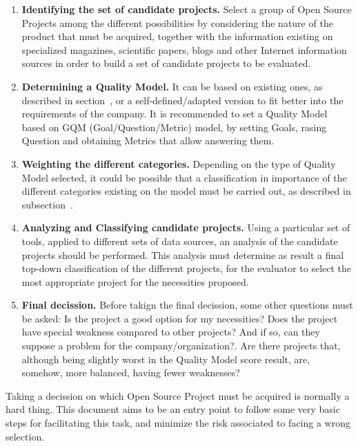 \documentclass[11pt]{article}
\begin{document}
\begin{enumerate}
\item{\textbf{Identifying the set of candidate projects.}} Select a group of Open Source Projects among the different possibilities by considering the nature of the product that must be acquired, together with the information existing on specialized magazines, scientific papers, blogs and other Internet information sources in order to build a set of candidate projects to be evaluated.
\item{\textbf{Determining a Quality Model.}} It can be based on existing ones, as described in section~, or a self-defined/adapted version to fit better into the requirements of the company. It is recommended to set a Quality Model based on GQM (Goal/Question/Metric) model, by setting Goals, rasing Question and obtaining Metrics that allow answering them.
\item{\textbf{Weighting the different categories.}} Depending on the type of Quality Model selected, it could be possible that a classification in importance of the different categories existing on the model must be carried out, as described in subsection~.
\item{\textbf{Analyzing and Classifying candidate projects.}} Using a particular set of tools, applied to different sets of data sources, an analysis of the candidate projects should be performed. This analysis must determine as result a final top-down classification of the different projects, for the evaluator to select the most appropriate project for the necessities proposed.
\item{\textbf{Final decission.}} Before takign the final decission, some other questions must be asked: Is the project a good option for my necessities? Does the project have special weakness compared to other projects? And if so, can they suppose a problem for the company/organization?. Are there projects that, although being slightly worst in the Quality Model score result, are, somehow, more balanced, having fewer weaknesses?
\end{enumerate}
Taking a decission on which Open Source Project must be acquired is normally a hard thing. This document aims to be an entry point to follow some very basic steps for facilitating this task, and minimize the risk associated to facing a wrong selection.

{}
\end{document}
